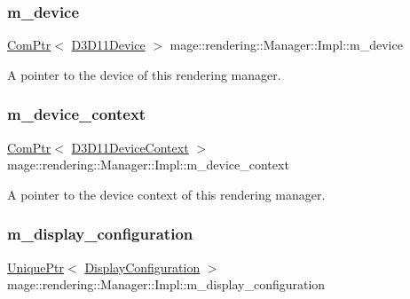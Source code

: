\subsubsection{\texorpdfstring{m\+\_\+device}{m\_device}}
{\footnotesize\ttfamily \hyperlink{namespacemage_ae74f374780900893caa5555d1031fd79}{Com\+Ptr}$<$ \hyperlink{namespacemage_1_1rendering_a7081b2c6e923fac0d42ff4862dc4a823}{D3\+D11\+Device} $>$ mage\+::rendering\+::\+Manager\+::\+Impl\+::m\+\_\+device\hspace{0.3cm}{\ttfamily [private]}}

A pointer to the device of this rendering manager. \hypertarget{classmage_1_1rendering_1_1_manager_1_1_impl_a4d65858be32aeb40527033cb0afd0911}{}\label{classmage_1_1rendering_1_1_manager_1_1_impl_a4d65858be32aeb40527033cb0afd0911} 
\subsubsection{\texorpdfstring{m\+\_\+device\+\_\+context}{m\_device\_context}}
{\footnotesize\ttfamily \hyperlink{namespacemage_ae74f374780900893caa5555d1031fd79}{Com\+Ptr}$<$ \hyperlink{namespacemage_1_1rendering_a4b23dd00d80ca4f6856375936261a13d}{D3\+D11\+Device\+Context} $>$ mage\+::rendering\+::\+Manager\+::\+Impl\+::m\+\_\+device\+\_\+context\hspace{0.3cm}{\ttfamily [private]}}

A pointer to the device context of this rendering manager. \hypertarget{classmage_1_1rendering_1_1_manager_1_1_impl_aa1a9ba866795d4497a0d43dac4b0188d}{}\label{classmage_1_1rendering_1_1_manager_1_1_impl_aa1a9ba866795d4497a0d43dac4b0188d} 
\subsubsection{\texorpdfstring{m\+\_\+display\+\_\+configuration}{m\_display\_configuration}}
{\footnotesize\ttfamily \hyperlink{namespacemage_a3316d7143a973e37adf1110f2e80ca31}{Unique\+Ptr}$<$ \hyperlink{classmage_1_1rendering_1_1_display_configuration}{Display\+Configuration} $>$ mage\+::rendering\+::\+Manager\+::\+Impl\+::m\+\_\+display\+\_\+configuration\hspace{0.3cm}{\ttfamily [private]}}

